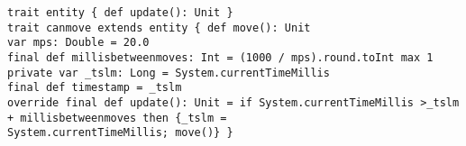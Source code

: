 \begin{lstlisting}
trait entity { def update(): Unit }
trait canmove extends entity { def move(): Unit
var mps: Double = 20.0
final def millisbetweenmoves: Int = (1000 / mps).round.toInt max 1
private var _tslm: Long = System.currentTimeMillis
final def timestamp = _tslm
override final def update(): Unit = if System.currentTimeMillis >_tslm + millisbetweenmoves then {_tslm =
System.currentTimeMillis; move()} }
\end{lstlisting}
